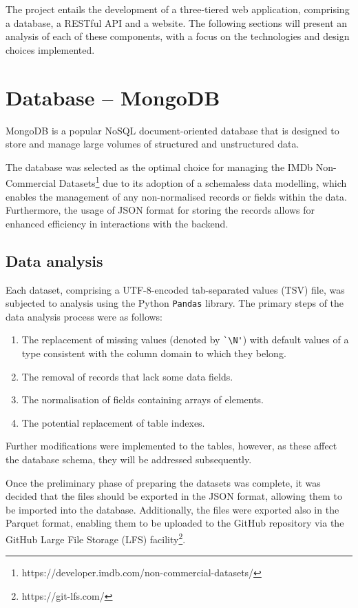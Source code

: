 
The project entails the development of a three-tiered web application, comprising a database, a RESTful API and a website.
The following sections will present an analysis of each of these components, with a focus on the technologies and design choices implemented.

\section{Database -- MongoDB}

MongoDB is a popular NoSQL document-oriented database that is designed to store and manage large volumes of structured and unstructured data.

The database was selected as the optimal choice for managing the IMDb Non-Commercial Datasets\footnote[1]{https://developer.imdb.com/non-commercial-datasets/} due to its adoption of a schemaless data modelling, which enables the management of any non-normalised records or fields within the data.
Furthermore, the usage of JSON format for storing the records allows for enhanced efficiency in interactions with the backend.

\subsection{Data analysis}

Each dataset, comprising a UTF-8-encoded tab-separated values (TSV) file, was subjected to analysis using the Python \verb|Pandas| library.
The primary steps of the data analysis process were as follows:

\begin{enumerate}
	\item The replacement of missing values (denoted by  \verb|`\N'|) with default values of a type consistent with the column domain to which they belong.
	\item The removal of records that lack some data fields.
	\item The normalisation of fields containing arrays of elements.
	\item The potential replacement of table indexes.
\end{enumerate}

Further modifications were implemented to the tables, however, as these affect the database schema, they will be addressed subsequently.

Once the preliminary phase of preparing the datasets was complete, it was decided that the files should be exported in the JSON format, allowing them to be imported into the database.
Additionally, the files were exported also in the Parquet format, enabling them to be uploaded to the GitHub repository via the GitHub Large File Storage (LFS) facility\footnote[2]{https://git-lfs.com/}. 


